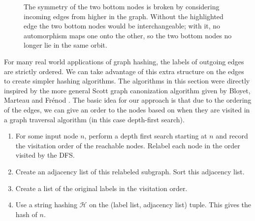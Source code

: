 \documentclass[twoside,leqno]{article}
\begin{document}
\begin{figure}[!b]
\centering
{}
\caption{The symmetry of the two bottom nodes is broken by considering
incoming edges from higher in the graph. Without the highlighted edge the two
bottom nodes would be interchangeable; with it, no automorphism maps one onto
the other, so the two bottom nodes no longer lie in the same orbit.}
\label{fig:breaksymmetry}
\end{figure}

For many real world applications of graph hashing, the labels of outgoing edges are strictly ordered.  We can take advantage of this extra structure on the edges to create simpler hashing algorithms. The algorithms in this section were directly inspired by the more general Scott graph canonization algorithm given by Bloyet, Marteau and Fr\'enod \cite{scott}. The basic idea for our approach is that due to the ordering of the edges, we can give an order to the nodes based on when they are visited in a graph traversal algorithm (in this case depth-first search).

\begin{algorithm}[H]
    \caption{Node Hash - Outgoing Ordered Edges}
    \label{alg:node-outgoing-edges}
    \begin{enumerate}
        \item For some input node $n$, perform a depth first search starting at $n$ and record the visitation order of the reachable nodes. Relabel each node in the order visited by the DFS.
        \item Create an adjacency list of this relabeled subgraph. Sort this adjacency list.
        \item Create a list of the original labels in the visitation order.
        \item Use a string hashing $\mathcal{H}$ on the (label list, adjacency list) tuple. This gives the hash of $n$.
    \end{enumerate}    
\end{algorithm}
\end{document}
